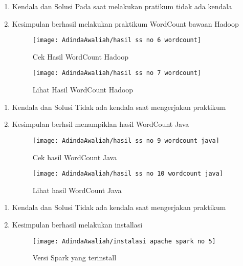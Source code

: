 \begin{enumerate}
\item Kendala dan Solusi
\newline Pada saat melakukan pratikum tidak ada kendala

\item Kesimpulan
\newline berhasil melakukan praktikum WordCount bawaan Hadoop

\begin{figure}[!ht]
\texttt{[image: AdindaAwaliah/hasil ss no 6 wordcount]}
\caption{Cek Hasil WordCount Hadoop}
\label{gam:hasil ss no 6 wordcount}
\end{figure}

\begin{figure}[!ht]
\texttt{[image: AdindaAwaliah/hasil ss no 7 wordcount]}
\caption{Lihat Hasil WordCount Hadoop}
\label{gam:hasil ss no 7 wordcount}
\end{figure}

\end{enumerate}

\begin{enumerate}
\item Kendala dan Solusi
\newline Tidak ada kendala saat mengerjakan praktikum

\item Kesimpulan
\newline berhsil menampiklan hasil WordCount Java

\begin{figure}[!ht]
\texttt{[image: AdindaAwaliah/hasil ss no 9 wordcount java]}
\caption{Cek hasil WordCount Java}
\label{gam:hasil ss no 9 wordcount java}
\end{figure}

\begin{figure}[!ht]
\texttt{[image: AdindaAwaliah/hasil ss no 10 wordcount java]}
\caption{Lihat hasil WordCount Java}
\label{gam:hasil ss no 9 wordcount java}
\end{figure}

\end{enumerate}

\begin{enumerate}
\item Kendala dan Solusi
\newline Tidak ada kendala saat mengerjakan praktikum

\item Kesimpulan
\newline berhasil melakukan installasi

\begin{figure}[!ht]
\texttt{[image: AdindaAwaliah/instalasi apache spark no 5]}
\caption{Versi Spark yang terinstall}
\label{gam:instalasi apache spark no 5}
\end{figure}

\end{enumerate}

